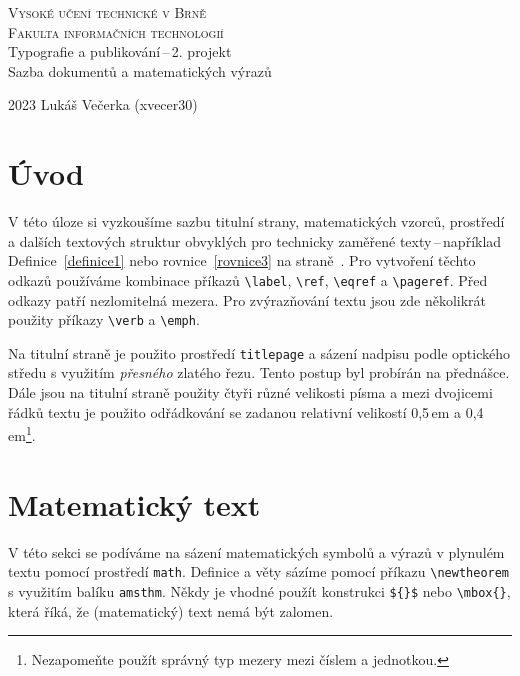 \documentclass[hidelinks, 11pt, a4paper, twocolumn]{article}
\theoremstyle{definition}
\theoremstyle{definition}
\begin{document}
\begin{titlepage}
    \begin{center}
        \textsc{\Huge Vysoké učení technické v Brně}\\
        \bigskip
        \textsc{\huge Fakulta informačních technologií}\\
        \LARGE Typografie a publikování\,--\,2. projekt\\
        Sazba dokumentů a matematických výrazů\\
    \end{center}
        {\Large 2023 \hfill Lukáš Večerka (xvecer30)}
\end{titlepage}

\newpage

\section*{Úvod}
\label{strana1}
V této úloze si vyzkoušíme sazbu titulní strany, matematických vzorců,
 prostředí a dalších textových struktur obvyklých pro technicky zaměřené
  texty\,--\,například Definice~\ref{definice1} nebo rovnice~\eqref{rovnice3} na straně~\pageref{strana1}. Pro vytvoření těchto odkazů
   používáme kombinace příkazů \verb|\label|, \verb|\ref|, \verb|\eqref| a \verb|\pageref|.
    Před odkazy patří nezlomitelná mezera. Pro zvýrazňování textu jsou zde několikrát
     použity příkazy \verb|\verb| a \verb|\emph|.
  
Na titulní straně je použito prostředí \texttt{titlepage} a
      sázení nadpisu podle optického středu s využitím \emph{přesného} zlatého řezu. Tento
       postup byl probírán na přednášce. Dále jsou na titulní straně použity čtyři různé
        velikosti písma a mezi dvojicemi řádků textu je použito odřádkování se zadanou relativní
         velikostí 0,5\,em a 0,4\,em\footnote[1]{Nezapomeňte použít správný typ mezery mezi číslem a jednotkou.}.

\section{Matematický text}
V této sekci se podíváme na sázení matematických symbolů a výrazů v plynulém textu pomocí prostředí \texttt{math}.
 Definice a věty sázíme pomocí příkazu \verb|\newtheorem| s využitím balíku \texttt{amsthm}. Někdy je vhodné použít konstrukci
  \verb|${}$| nebo \verb|\mbox{}|, která říká, že (matematický) text nemá být zalomen.
\end{document}
